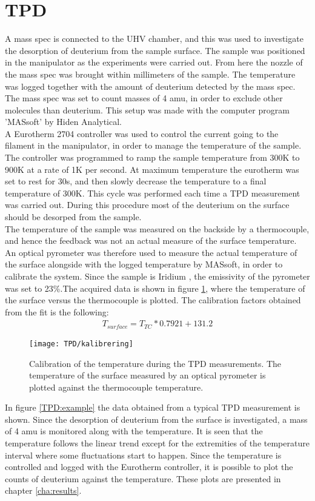 \section{TPD}

A mass spec is connected to the UHV chamber, and this was used to investigate the desorption of deuterium from the sample surface. The sample was positioned in the manipulator as the experiments were carried out. From here the nozzle of the mass spec was brought within millimeters of the sample. The temperature was logged together with the amount of deuterium detected by the mass spec. The mass spec was set to count masses of 4 amu, in order to exclude other molecules than deuterium. This setup was made with the computer program 'MASsoft' by Hiden Analytical.\\
A Eurotherm 2704 controller was used to control the current going to the filament in the manipulator, in order to manage the temperature of the sample. The controller was programmed to ramp the sample temperature from 300K to 900K at a rate of 1K per second. At maximum temperature the eurotherm was set to rest for 30s, and then slowly decrease the temperature to a final temperature of 300K. This cycle was performed each time a TPD measurement was carried out. During this procedure most of the deuterium on the surface should be desorped from the sample.\\
The temperature of the sample was measured on the backside by a thermocouple, and hence the feedback was not an actual measure of the surface temperature. An optical pyrometer was therefore used to measure the actual temperature of the surface alongside with the logged temperature by MASsoft, in order to calibrate the system. Since the sample is Iridium , the emissivity of the pyrometer was set to 23\%.The acquired data is shown in figure \ref{TPDcalibration}, where the temperature of the surface versus the thermocouple is plotted. The calibration factors obtained from the fit is the following:
\begin{align*}
  T_{surface} = T_{TC} * 0.7921 + 131.2
\end{align*}
\begin{figure}
  \centering
  \texttt{[image: TPD/kalibrering]}
  \caption{Calibration of the temperature during the TPD measurements. The temperature of the surface measured by an optical pyrometer is plotted against the thermocouple temperature.}
  \label{TPDcalibration}
\end{figure}
In figure \ref{TPD:example} the data obtained from a typical TPD measurement is shown. Since the desorption of deuterium from the surface is investigated, a mass of 4 amu is monitored along with the temperature. It is seen that the temperature follows the linear trend except for the extremities of the temperature interval where some fluctuations start to happen. Since the temperature is controlled and logged with the Eurotherm controller, it is possible to plot the counts of deuterium against the temperature. These plots are presented in chapter \ref{cha:results}.\\
